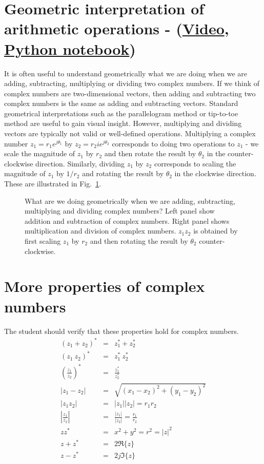 \section{Geometric interpretation of arithmetic operations - (\href{https://youtu.be/A0j17Gg3JCM}{Video},
\href{https://colab.research.google.com/drive/1IPisKbolmXp2UD7ZuxIRhMEjvaq_Q82G?usp=sharing}{Python notebook})}
It is often useful to understand geometrically what we are doing when we are adding, subtracting, multiplying or dividing two complex numbers.
If we think of complex numbers are two-dimensional vectors, then adding and subtracting two complex numbers is the same as adding and subtracting vectors.
Standard geometrical interpretations such as the parallelogram method or tip-to-toe method are useful to gain visual insight.
However, multiplying and dividing vectors are typically not valid or well-defined operations.
Multiplying a complex number $z_1 = r_1 e^{j \theta_1}$ by $z_2 = r_2 ie^{j \theta_2}$ corresponds to doing two operations to $z_1$ - we scale the magnitude of $z_1$ by $r_2$ and then rotate the result by $\theta_2$ in the counter-clockwise direction.
Similarly, dividing $z_1$ by $z_2$ corresponds to scaling the magnitude of $z_1$ by $1/r_2$ and rotating the result by $\theta_2$ in the clockwise direction.
These are illustrated in Fig.~\ref{fig:geometricinterpretation}.

\begin{figure}[h]
  \centering
  
  \caption{What are we doing geometrically when we are adding, subtracting, multiplying and dividing complex numbers?
  Left panel show addition and subtraction of complex numbers. Right panel shows multiplication and division of complex numbers.
  $z_1 z_2$ is obtained by first scaling $z_1$ by $r_2$ and then rotating the result by $\theta_2$ counter-clockwise.}
  \label{fig:geometricinterpretation}
\end{figure}


\section{More properties of complex numbers}
The student should verify that these properties hold for complex numbers.
\begin{eqnarray}
\nonumber (z_1+z_2)^* & = & z_1^* + z_2^*\\
\nonumber (z_1 \ z_2)^* & = & z_1^* \ z_2^* \\
\nonumber \left(\frac{z_1}{z_2}\right)^* & = & \frac{z_1^*}{z_2^*} \\
\nonumber |z_1-z_2| &=& \sqrt{(x_1-x_2)^2+(y_1-y_2)^2}\\
\nonumber |z_1z_2| &=& |z_1||z_2| = r_1 r_2 \\
\nonumber \left|\frac{z_1}{z_2}\right| &=& \frac{|z_1|}{|z_2|} = \frac{r_1}{r_2}\\
\nonumber z z^* &=& x^2 + y^2 = r^2 = |z|^2\\
\nonumber z + z^* & = & 2 \Re\{z\} \\
\nonumber z - z^* & = & 2 j \Im \{z\}
\end{eqnarray}

